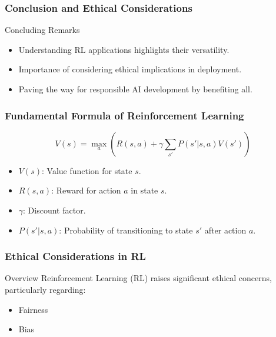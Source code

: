 \documentclass{beamer}
\begin{document}
\begin{frame}[fragile]
    \frametitle{Conclusion and Ethical Considerations}
    \begin{block}{Concluding Remarks}
        \begin{itemize}
            \item Understanding RL applications highlights their versatility.
            \item Importance of considering ethical implications in deployment.
            \item Paving the way for responsible AI development by benefiting all.
        \end{itemize}
    \end{block}
\end{frame}

\begin{frame}[fragile]
    \frametitle{Fundamental Formula of Reinforcement Learning}
    \begin{equation}
        V(s) = \max_a \left( R(s, a) + \gamma \sum_{s'} P(s'|s, a) V(s') \right)
    \end{equation}
    \begin{itemize}
        \item $V(s)$: Value function for state $s$.
        \item $R(s, a)$: Reward for action $a$ in state $s$.
        \item $\gamma$: Discount factor.
        \item $P(s'|s, a)$: Probability of transitioning to state $s'$ after action $a$.
    \end{itemize}
\end{frame}

\begin{frame}[fragile]
    \frametitle{Ethical Considerations in RL}
    
    \begin{block}{Overview}
        Reinforcement Learning (RL) raises significant ethical concerns, particularly regarding:
        \begin{itemize}
            \item Fairness
            \item Bias
        \end{itemize}
    \end{block}
\end{frame}
\end{document}

